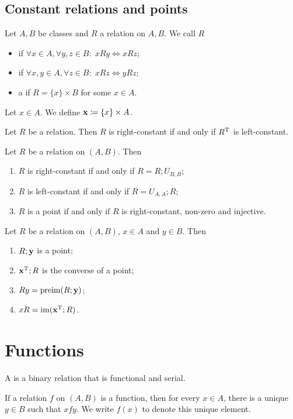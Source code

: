 \subsection{Constant relations and points}
\begin{definition}
Let $A,B$ be classes and $R$ a relation on $A,B$. We call $R$
\begin{itemize}
\item {} if $\forall x\in A, \forall y,z \in B: \; xRy \iff xRz$;
\item {} if $\forall x, y\in A, \forall z \in B: \; xRz \iff yRz$;
\item a  if $R = \{x\}\times B$ for some $x\in A$.
\end{itemize}
Let $x\in A$. We define $\point{x} \defeq \{x\}\times A$.
\end{definition}

\begin{lemma}
Let $R$ be a relation. Then $R$ is right-constant \textup{if and only if} $R^{\mathrm{T}}$ is left-constant.
\end{lemma}

\begin{lemma}
Let $R$ be a relation on $(A, B)$. Then
\begin{enumerate}
\item $R$ is right-constant \textup{if and only if} $R = R;U_{B,B}$;
\item $R$ is left-constant \textup{if and only if} $R = U_{A,A};R$;
\item $R$ is a point \textup{if and only if} $R$ is right-constant, non-zero and injective.
\end{enumerate}
\end{lemma}

\begin{lemma}
Let $R$ be a relation on $(A,B)$, $x\in A$ and $y\in B$. Then
\begin{enumerate}
\item $R;\point{y}$ is a point;
\item $\point{x}^\transp; R$ is the converse of a point;
\item $Ry = \preim(R;\point{y})$;
\item $xR = \im(\point{x}^\transp; R)$.
\end{enumerate}
\end{lemma}

\section{Functions}
\begin{definition}
A  is a binary relation that is functional and serial.
\end{definition}
If a relation $f$ on $(A, B)$ is a function, then for every $x\in A$, there is a unique $y\in B$ such that $xfy$. We write $f(x)$ to denote this unique element.

